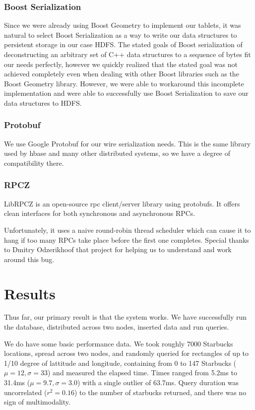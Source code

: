 \documentclass[11pt]{article}
\begin{document}
\subsubsection{Boost Serialization}

Since we were already using Boost Geometry to implement our tablets, it was natural to select Boost Serialization as a way to write our data structures to persistent storage in our case HDFS. The stated goals of Boost serialization of deconstructing an arbitrary set of C++ data structures to a sequence of bytes fit our needs perfectly, however we quickly realized that the stated goal was not achieved completely even when dealing with other Boost libraries such as the Boost Geometry library. However, we were able to workaround this incomplete implementation and were able to successfully use Boost Serialization to save our data structures to HDFS.

\subsubsection{Protobuf}

We use Google Protobuf for our wire serialization needs. This is the same library used by hbase and many other distributed systems, so we have a degree of compatibility there.

\subsubsection{RPCZ}

LibRPCZ is an open-source rpc client/server library using protobufs. It offers clean interfaces for both synchronous and asynchronous RPCs.

Unfortunately, it uses a naive round-robin thread scheduler which can cause it to hang if too many RPCs take place before the first one completes. Special thanks to Dmitry Odzerikhoof that project for helping us to understand and work around this bug.

\section{Results}

Thus far, our primary result is that the system works.  We have successfully run the database, distributed across two nodes, inserted data and run queries.

We do have some basic performance data.  We took roughly 7000 Starbucks locations, spread across two nodes, and randomly queried for rectangles of up to 1/10 degree of lattitude and longitude, containing from 0 to 147 Starbucks ($\mu=12, \sigma=33$) and measured the elapsed time.  Times ranged from 5.2ms to 31.4ms ($\mu=9.7, \sigma=3.0$) with a single outlier of 63.7ms.  Query duration was uncorrelated ($r^2=0.16$) to the number of starbucks returned, and there was no sign of multimodality.
\end{document}
